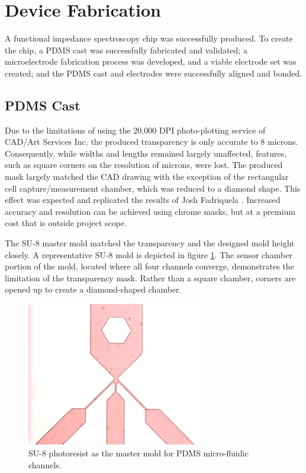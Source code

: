 
\section{Device Fabrication}

\par A functional impedance spectroscopy chip was successfully produced. To create the chip, a PDMS cast was successfully fabricated and validated; a microelectrode fabrication process was developed, and a viable electrode set was created; and the PDMS cast and electrodes were successfully aligned and bonded.

\subsection{PDMS Cast}
\label{sec:PDMS_cast_fabrication}

\par Due to the limitations of using the 20,000 DPI photo-plotting service of CAD/Art Services Inc, the produced transparency is only accurate to 8 microns. Consequently, while widths and lengths remained largely unaffected, features, such as square corners on the resolution of microns, were lost. The produced mask largely matched the CAD drawing with the exception of the rectangular cell capture/measurement chamber, which was reduced to a diamond shape. This effect was expected and replicated the results of Josh Fadriquela \cite{fadriquela_design_2009-1}. Increased accuracy and resolution can be achieved using chrome masks, but at a premium cost that is outside project scope. 

\par The SU-8 master mold matched the transparency and the designed mold height closely. A representative SU-8 mold is depicted in figure \ref{fig:su8_results}. The sensor chamber portion of the mold, located where all four channels converge, demonstrates the limitation of the transparency mask. Rather than a square chamber, corners are opened up to create a diamond-shaped chamber.

\begin{figure}[H]
    \centering
    \includegraphics[width=0.7\textwidth]{images/su8_results.png}
    \caption{SU-8 photoresist as the master mold for PDMS micro-fluidic channels.}
    \label{fig:su8_results}
\end{figure}


